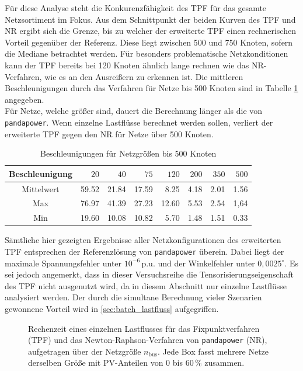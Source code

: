 Für diese Analyse steht die Konkurenzfähigkeit des TPF für das gesamte Netzsortiment im Fokus.
Aus dem Schnittpunkt der beiden Kurven des TPF und NR ergibt sich die Grenze, bis zu welcher der erweiterte TPF einen rechnerischen Vorteil gegenüber der Referenz.
Diese liegt zwischen 500 und 750 Knoten, sofern die Mediane betrachtet werden. 
Für besonders problematische Netzkonditionen kann der TPF bereits bei 120 Knoten ähnlich lange rechnen wie das NR-Verfahren, wie es an den Ausreißern zu erkennen ist.
Die mittleren Beschleunigungen durch das Verfahren für Netze bis 500 Knoten sind in Tabelle \ref{tab:speedups} angegeben.\\
Für Netze, welche größer sind, dauert die Berechnung länger als die von \texttt{pandapower}.
Wenn einzelne Lastflüsse berechnet werden sollen, verliert der erweiterte TPF gegen den NR für Netze über 500 Knoten.

\begin{table}[htbp]
	\caption{Beschleunigungen für Netzgrößen bis 500 Knoten}
	\label{tab:speedups}
	\centering
	\begin{tabular}{c|r|r|r|r|r|r|r}
		\toprule
		Beschleunigung & $20$ & $40$ & $75$ & $120$ & $200$ & $350$ & $500$ \\
		\midrule
		Mittelwert & 59.52&21.84&17.59&8.25&4.18&2.01&1.56\\
		Max & 76.97&41.39&27.23&12.60&5.53&2.54&1,64\\
		Min & 19.60&10.08&10.82&5.70&1.48&1.51&0.33\\
		\bottomrule
	\end{tabular}
	
\end{table}

Sämtliche hier gezeigten Ergebnisse aller Netzkonfigurationen des erweiterten TPF entsprechen der Referenzlösung von \texttt{pandapower} überein.
Dabei liegt der maximale Spannungsfehler unter $10^{-6}\,\mathrm{p.u.}$ und der Winkelfehler unter $0{,}0025^\circ$.
Es sei jedoch angemerkt, dass in dieser Versuchsreihe die Tensorisierungseigenschaft des TPF nicht ausgenutzt wird, da in diesem Abschnitt nur einzelne Lastflüsse analysiert werden. 
Der durch die simultane Berechnung vieler Szenarien gewonnene Vorteil wird in \cref{sec:batch_lastfluss} aufgegriffen.




\begin{figure}[htb]
	\centering
	
	\caption{Rechenzeit eines einzelnen Lastflusses für das Fixpunktverfahren
		(TPF) und das Newton-Raphson-Verfahren von \texttt{pandapower} (NR),
		aufgetragen über der Netzgröße $n_\mathrm{bus}$. Jede Box fasst mehrere Netze
		derselben Größe mit PV-Anteilen von $0$ bis $60\,\%$ zusammen.}
	\label{fig:timing_vs_size_from_csv}
\end{figure}

